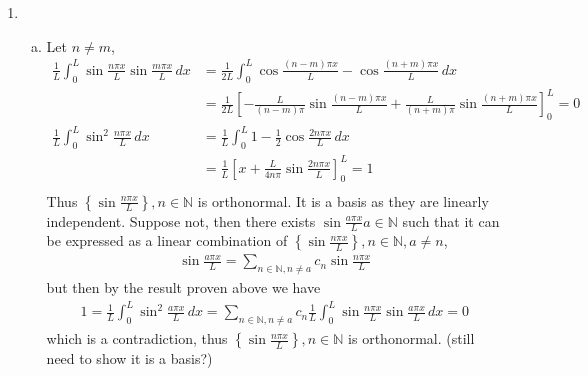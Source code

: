 \documentclass[a4paper,12pt]{article}
\theoremstyle{definition}
\begin{document}
\begin{enumerate}
\item
\begin{enumerate}[(a)]
\item Let $n \neq m$,
\begin{align*}
\frac{1}{L}\int_{0}^{L}\sin \frac{n \pi x}{L}\sin \frac{m \pi x}{L}\,dx & = \frac{1}{2L}\int_{0}^{L}\cos \frac{(n-m) \pi x}{L}-\cos \frac{(n+m) \pi x}{L}\,dx\\
&=\frac{1}{2L}\left[-\frac{L}{(n-m)\pi}\sin \frac{(n-m) \pi x}{L}+\frac{L}{(n+m)\pi}\sin \frac{(n+m) \pi x}{L}\right]_{0}^{L}=0\\
\frac{1}{L}\int_{0}^{L}\sin^2 \frac{n \pi x}{L}\,dx &=\frac{1}{L}\int_{0}^{L}1 - \frac{1}{2}\cos \frac{2n \pi x}{L}\,dx\\
&=\frac{1}{L}\left[x + \frac{L}{4n\pi}\sin \frac{2n \pi x}{L}\right]_{0}^{L}=1\\
\end{align*}
Thus $\left\{\sin \frac{n\pi x}{L}\right\}, n \in \mathbb{N}$ is orthonormal. It is a basis as they are linearly independent. Suppose not, then there exists $\sin \frac{a\pi x}{L} a \in \mathbb{N}$ such that it can be expressed as a linear combination of $\left\{\sin \frac{n\pi x}{L}\right\}, n \in \mathbb{N}, a \neq n$,
\begin{align*}
\sin \frac{a\pi x}{L} = \sum_{n \in \mathbb{N}, n\neq a} c_n \sin \frac{n\pi x}{L}
\end{align*}
but then by the result proven above we have 
\begin{align*}
1 = \frac{1}{L}\int_{0}^{L}\sin^2 \frac{a\pi x}{L} \,dx= \sum_{n \in \mathbb{N}, n\neq a} c_n \frac{1}{L}\int_{0}^{L}\sin \frac{n\pi x}{L}\sin \frac{a\pi x}{L} \, dx = 0
\end{align*}
which is a contradiction, thus $\left\{\sin \frac{n\pi x}{L}\right\}, n \in \mathbb{N}$ is orthonormal. (still need to show it is a basis?)


\end{enumerate}
\end{enumerate}
\end{document}
